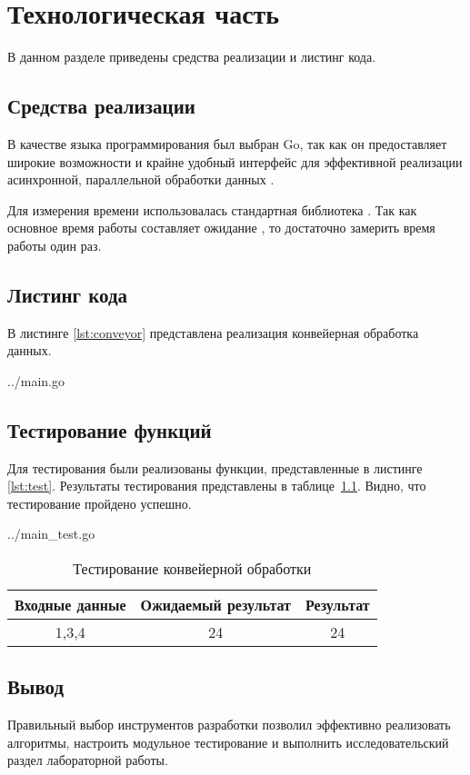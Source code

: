 \chapter{Технологическая часть}

В данном разделе приведены средства реализации и листинг кода.

\section{Средства реализации}

В качестве языка программирования был выбран Go, так как он предоставляет широкие возможности и крайне удобный интерфейс для эффективной реализации асинхронной, параллельной обработки данных \cite{go}.

Для измерения времени использовалась стандартная библиотека .
Так как основное время работы составляет ожидание , то достаточно замерить время работы один раз.

\section{Листинг кода}

В листинге \ref{lst:conveyor} представлена реализация конвейерная обработка данных.

\begin{lstinputlisting}[
	caption={Алгоритм сортировки пузырьком},
	label={lst:conveyor},
	style={go}
]{../main.go}
\end{lstinputlisting}

\section{Тестирование функций}

Для тестирования были реализованы функции, представленные в листинге \ref{lst:test}.
Результаты тестирования представлены в таблице~\ref{tbl:test}. Видно, что тестирование пройдено успешно.

\begin{lstinputlisting}[
	caption={Тестовые задачи},
	label={lst:test},
	style={go},
	linerange={12-27}
]{../main_test.go}
\end{lstinputlisting}

\begin{table}[h!]
	\begin{center}
		\begin{tabular}{|c|c|c|}
			\hline
			Входные данные & Ожидаемый результат & Результат \\ 
			\hline
			1,3,4 & 24  & 24\\
			\hline
		\end{tabular}
		\caption{\label{tbl:test}Тестирование конвейерной обработки}
	\end{center}
\end{table}

\section*{Вывод}

Правильный выбор инструментов разработки позволил эффективно реализовать алгоритмы, настроить модульное тестирование и выполнить исследовательский раздел лабораторной работы.
